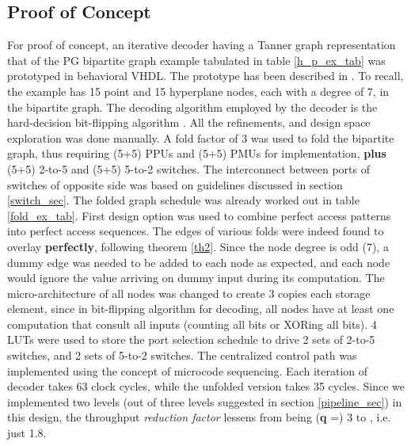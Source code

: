 \documentclass[12pt]{article}
\begin{document}
\subsection{Proof of Concept}
For proof of concept, an iterative decoder having a Tanner graph
representation that of the PG bipartite graph example tabulated in table
\ref{h_p_ex_tab} was prototyped in behavioral VHDL. The prototype
has been described in \cite{ldpc_pap}. To recall, the example
has 15 point and 15 hyperplane nodes, each with a degree of 7, in the
bipartite graph. The decoding algorithm employed by the decoder is the
hard-decision bit-flipping algorithm \cite{guilloud}. All the refinements,
and design space exploration was done manually. A fold factor of 3 was used
to fold the bipartite graph, thus requiring (5+5) PPUs and
(5+5) PMUs for implementation, \textbf{plus} (5+5) 2-to-5 and (5+5)
5-to-2 switches. The interconnect between ports of switches of opposite
side was based on guidelines discussed in section \ref{switch_sec}. 
The folded graph schedule was already worked out in table
\ref{fold_ex_tab}. First design option was used to combine perfect access
patterns into perfect access sequences. The edges of various folds were
indeed found to overlay \textbf{perfectly}, following theorem
\ref{th2}. Since the node degree is odd (7), a dummy edge was needed to be
added to each node as expected, and each node would ignore the value
arriving on dummy input during its computation. The micro-architecture of
all nodes was changed to create 3 copies each storage element, since in
bit-flipping algorithm for decoding, all nodes have at least one
computation that consult all inputs (counting all bits or XORing all
bits). 4 LUTs were used to store the port selection schedule to
drive 2 sets of 2-to-5
switches, and 2 sets of 5-to-2 switches. The centralized control path was
implemented using the concept of microcode sequencing. Each
iteration of decoder takes 63 clock cycles, while the unfolded version
takes 35 cycles. Since we implemented two levels (out of three levels
suggested in section \ref{pipeline_sec}) in this design, the throughput
\textit{reduction factor} lessens from being (\textbf{q} =) 3 to
, i.e. just 1.8.
\end{document}
